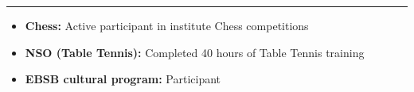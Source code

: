\documentclass[a4paper,10pt]{article}
\newlength{\cvcolumngapwidth}
\newlength{\cvleftcolumnwidth}
\newlength{\cvrightcolumnwidth}
\newcommand{\cvsectionstyle}[1]{{\normalsize\cvsectionfont\textcolor{cvsectioncolor}{#1}}}
\newcommand{\cvheadingstyle}[1]{{\normalsize\cvheadingfont\textcolor{cvheadingcolor}{#1}}}
\newlength{\cvafteritemskipamount}
\newlength{\cvaftersectionskipamount}
\newlength{\cvbetweensectionandheadingextraskipamount}
\newlength{\cvparskip}
\newcommand{\cvsection}[1]{
    \begin{minipage}[t]{\cvleftcolumnwidth}
        \raggedleft\cvsectionstyle{#1}
    \end{minipage}%
    \hspace{\cvcolumngapwidth}%
    \begin{minipage}[t]{\cvrightcolumnwidth}
        \textcolor{cvrulecolor}{\rule{\cvrightcolumnwidth}{0.3mm}}
    \end{minipage}

    \vspace{\cvaftersectionskipamount}
}
\newcommand{\cvitem}[2]{
    \begin{minipage}[t]{\cvleftcolumnwidth}
        \raggedleft #1
    \end{minipage}%
    \hspace{\cvcolumngapwidth}%
    \begin{minipage}[t]{\cvrightcolumnwidth}
        \setlength{\parskip}{\cvparskip} #2
    \end{minipage}

    \vspace{\cvafteritemskipamount}
}
\begin{document}

\cvsection{EXTRACURRICULAR ACTIVITIES}

\vspace{\cvbetweensectionandheadingextraskipamount}

\cvitem{
    \cvheadingstyle{}
}{
    
    \begin{itemize}[leftmargin=*]
        \item \textbf{Chess:} Active participant in institute Chess competitions
        \item \textbf{NSO (Table Tennis):} Completed 40 hours of Table Tennis training
        \item \textbf{EBSB cultural program:} Participant
        
    \end{itemize}

    
}
\end{document}
